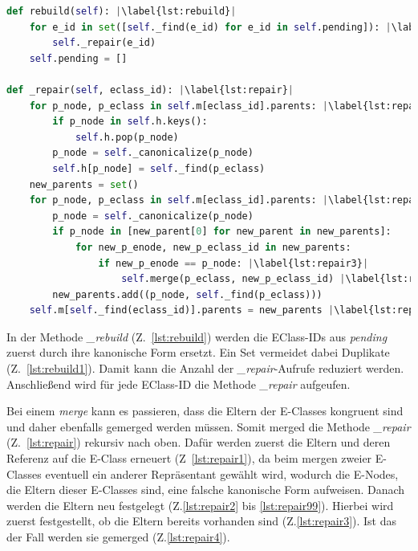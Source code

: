 \begin{lstlisting}[language=Python, escapechar=|, caption=\textit{rebuild}- und \textit{repair}-Methode, label={lst:methods2}]
def rebuild(self): |\label{lst:rebuild}|
    for e_id in set([self._find(e_id) for e_id in self.pending]): |\label{lst:rebuild1}|
        self._repair(e_id)
    self.pending = []

def _repair(self, eclass_id): |\label{lst:repair}|
    for p_node, p_eclass in self.m[eclass_id].parents: |\label{lst:repair1}|
        if p_node in self.h.keys():
            self.h.pop(p_node)
        p_node = self._canonicalize(p_node)
        self.h[p_node] = self._find(p_eclass)
    new_parents = set()
    for p_node, p_eclass in self.m[eclass_id].parents: |\label{lst:repair2}|
        p_node = self._canonicalize(p_node)
        if p_node in [new_parent[0] for new_parent in new_parents]:
            for new_p_enode, new_p_eclass_id in new_parents:
                if new_p_enode == p_node: |\label{lst:repair3}|
                    self.merge(p_eclass, new_p_eclass_id) |\label{lst:repair4}|
        new_parents.add((p_node, self._find(p_eclass)))
    self.m[self._find(eclass_id)].parents = new_parents |\label{lst:repair99}|
\end{lstlisting} 

In der Methode \textit{\_rebuild} (Z.~\ref{lst:rebuild}) werden die EClass-IDs aus \textit{pending} zuerst durch ihre kanonische Form ersetzt. Ein Set vermeidet dabei Duplikate (Z.~\ref{lst:rebuild1}).  
Damit kann die Anzahl der \textit{\_repair}-Aufrufe reduziert werden.
Anschließend wird für jede EClass-ID die Methode \textit{\_repair} aufgeufen.

Bei einem \textit{merge} kann es passieren, dass die Eltern der E-Classes kongruent sind und daher ebenfalls gemerged werden müssen. Somit merged die Methode \textit{\_repair} (Z.~\ref{lst:repair}) 
rekursiv nach oben. Dafür werden zuerst die Eltern und deren Referenz auf die E-Class erneuert (Z~\ref{lst:repair1}), da beim mergen zweier E-Classes eventuell ein anderer Repräsentant
gewählt wird, wodurch die E-Nodes, die Eltern dieser E-Classes sind, eine falsche kanonische Form aufweisen.
Danach werden die Eltern neu festgelegt (Z.\ref{lst:repair2} bis \ref{lst:repair99}). Hierbei wird zuerst festgestellt, ob die Eltern bereits vorhanden sind (Z.\ref{lst:repair3}). Ist das der Fall werden sie
gemerged (Z.\ref{lst:repair4}).

